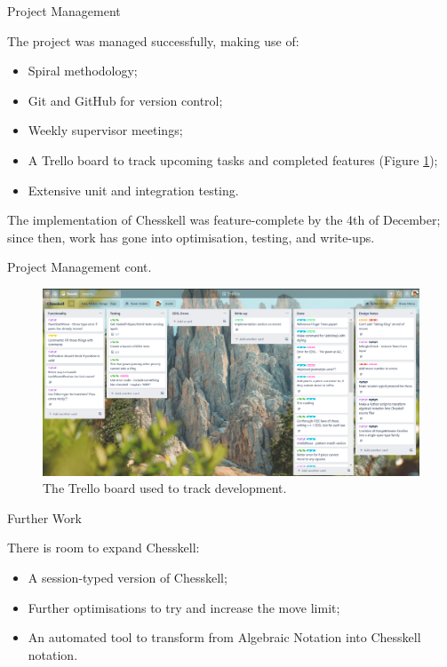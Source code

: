 \documentclass{beamer}
\begin{document}
\begin{frame}{Project Management}

The project was managed successfully, making use of:

\begin{itemize}
    \item Spiral methodology;
    \item Git and GitHub for version control;
    \item Weekly supervisor meetings;
    \item A Trello board to track upcoming tasks and completed features (Figure \ref{trello}); 
    \item Extensive unit and integration testing.
\end{itemize}

\pause

The implementation of Chesskell was feature-complete by the 4th of December; since then, work has gone into optimisation, testing, and write-ups.


\end{frame}

\begin{frame}{Project Management cont.}
\begin{figure}
    \includegraphics[width=\linewidth]{trello.png}
    \caption{The Trello board used to track development.}
    \label{trello}
\end{figure}
\end{frame}

\begin{frame}{Further Work}

There is room to expand Chesskell:

\pause

\begin{itemize}
    \item<2-> A session-typed version of Chesskell;
    \item<3-> Further optimisations to try and increase the move limit;
    \item<4-> An automated tool to transform from Algebraic Notation into Chesskell notation.
\end{itemize}
    
\end{frame}
\end{document}
